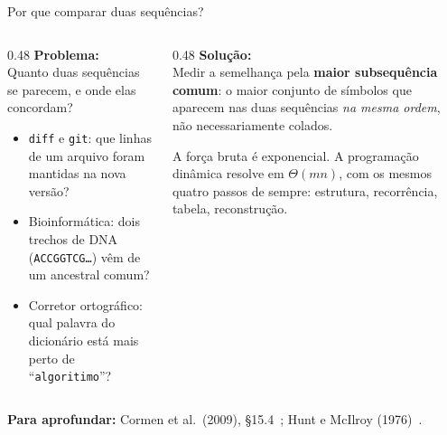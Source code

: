 \documentclass[aspectratio=169,xcolor=table]{beamer}
\newcommand{\fonte}[1]{%
  \vfill
  {\tiny\color{gray!55!black}\textbf{Para aprofundar:} #1\par}%
}
\begin{document}
\begin{frame}{Por que comparar duas sequências?}
  \begin{columns}[T]
    \begin{column}{0.48\textwidth}
      \textbf{Problema:}\\[2pt]
      \scriptsize Quanto duas sequências se parecem, e onde elas concordam?
      \begin{itemize}\scriptsize
        \item \texttt{diff} e \texttt{git}: que linhas de um arquivo foram mantidas na
              nova versão?
        \item Bioinformática: dois trechos de DNA (\texttt{ACCGGTCG\dots}) vêm de um
              ancestral comum?
        \item Corretor ortográfico: qual palavra do dicionário está mais perto de
              ``\texttt{algoritimo}''?
      \end{itemize}
    \end{column}
    \begin{column}{0.48\textwidth}
      \textbf{Solução:}\\[2pt]
      \scriptsize Medir a semelhança pela \textbf{maior subsequência comum}: o maior
      conjunto de símbolos que aparecem nas duas sequências \emph{na mesma ordem},
      não necessariamente colados.
      \medskip

      A força bruta é exponencial. A programação dinâmica resolve em $\Theta(mn)$, com
      os mesmos quatro passos de sempre: estrutura, recorrência, tabela, reconstrução.
    \end{column}
  \end{columns}
  \fonte{Cormen et al.\ (2009), \S 15.4~\cite{cormen2009introduction};
    Hunt e McIlroy (1976)~\cite{hunt1976algorithm}.}
\end{frame}
\end{document}
